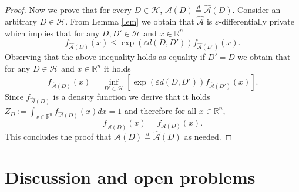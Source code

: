 \documentclass[12pt,a4paper]{article}
\numberwithin{equation}{section}
\numberwithin{equation}{section}
\renewcommand{\epsilon}{\varepsilon}
\newcommand{\1}{{\text{\Large $\mathfrak 1$}}}
\newcommand{\2}[1]{{\text{\Large $\mathfrak 1$}\!\left(#1\right)}}
\begin{document}
\begin{proof}
Now we prove that for every $D \in \mathcal{H}$, $\mathcal{A}(D) \overset{d}{=}  \hat{\mathcal{A}}(D)$. Consider an arbitrary $D \in \mathcal{H}$. From Lemma \ref{lem} we obtain that $\hat{\mathcal{A}}$ is $\epsilon$-differentially private which implies that for any $D,D' \in \mathcal{H}$ and $x \in \mathbb{R}^n$ \begin{equation}  f_{\hat{\mathcal{A}}(D)}(x) \leq \exp \left(\epsilon d(D,D') \right) f_{\hat{\mathcal{A}}(D')}(x).   \end{equation}Observing that the above inequality holds as equality if $D'=D$ we obtain that for any $D \in \mathcal{H}$ and $x \in \mathbb{R}^n$ it holds $$f_{\hat{\mathcal{A}}(D)}(x)=\inf_{D' \in \mathcal{H}}  \left[ \exp \left( \epsilon d(D,D') \right) f_{\hat{\mathcal{A}}(D')}(x) \right].$$ Since $f_{\hat{\mathcal{A}}(D)}$ is a density function we derive that it holds $Z_{D}:=\int_{x \in \mathbb{R}^n} f_{\hat{\mathcal{A}}(D)}(x) dx=1$ and therefore for all $x \in \mathbb{R}^n$, $$ f_{\hat{\mathcal{A}}(D)}(x)=f_{\mathcal{A}(D)}(x).$$ This concludes the proof that $\mathcal{A}(D) \overset{d}{=}  \hat{\mathcal{A}}(D)$ as needed. 
\end{proof}

\section{Discussion and open problems}
\end{document}
